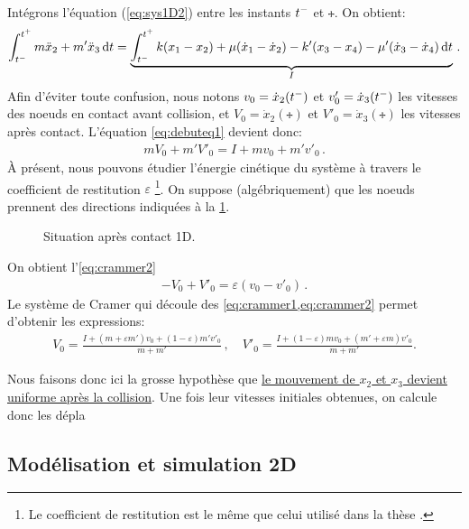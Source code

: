 \noindent Intégrons l'équation (\ref{eq:sys1D2}) entre les instants $t^{-}$ et $\tplus$. On obtient:
\begin{align}    \label{eq:debuteq1}
    \int_{\tmoins}^{\tplus} m\ddot x_2 + m'\ddot x_3 \diff t = \underbrace{\int_{\tmoins}^{\tplus} k(x_1 - x_2) + \mu (\dot x_1 - \dot x_2) - k'(x_3 - x_4) - \mu'(\dot x_3 - \dot x_4) \diff t}_{I} \,.
\end{align}
Afin d'éviter toute confusion, nous notons $v_0 = \dot{x}_2(t^{-})$ et $v'_0 = \dot{x}_3(t^{-})$ les vitesses des noeuds en contact avant collision, et $V_0 = \dot{x}_2(\tplus)$ et $V'_0 = \dot{x}_3(\tplus)$ les vitesses après contact. L'équation \cref{eq:debuteq1} devient donc:
\begin{align} \label{eq:crammer1}
    mV_0 + m'V'_0 = I + mv_0 + m'v'_0 \,.
\end{align}
À présent, nous pouvons étudier l'énergie cinétique du système à travers le coefficient de restitution $\varepsilon$ \footnote{Le coefficient de restitution est le même que celui utilisé dans la thèse \parencite{rabatel2015thesis}.}. On suppose (algébriquement) que les noeuds prennent des directions indiquées à la \cref{fig:contact1dapres}. 
\begin{figure}[!h]
    \centering
    \caption{Situation après contact 1D.}
    \label{fig:contact1dapres}
\end{figure}

\noindent On obtient l'\cref{eq:crammer2}
\begin{align} \label{eq:crammer2}
    - V_0 + V'_0 = \varepsilon (v_0 - v'_0) \,.
\end{align}
Le système de Cramer qui découle des \cref{eq:crammer1,eq:crammer2} permet d'obtenir les expressions:
\begin{align}
    V_0 = \frac{I + (m+\varepsilon m')v_0 + (1-\varepsilon)m'v'_0}{m+m'} \,, \quad V'_0 = \frac{I + (1-\varepsilon)mv_0 + (m'+\varepsilon m)v'_0}{m+m'}.
\end{align}

Nous faisons donc ici la grosse hypothèse que \underline{le mouvement de $x_2$ et $x_3$ devient uniforme après la collision}. Une fois leur vitesses initiales obtenues, on calcule donc les dépla





\subsection{Modélisation et simulation 2D}









